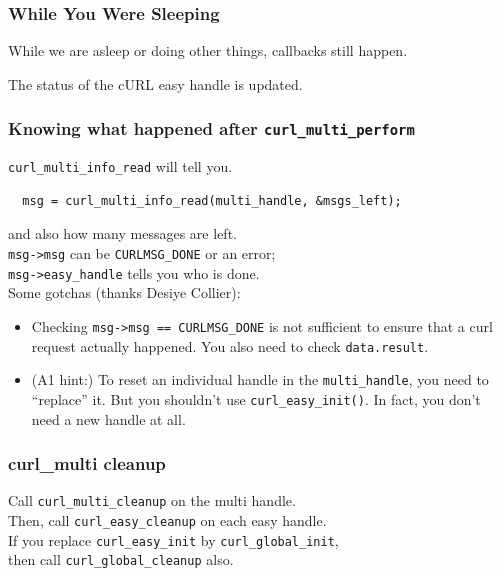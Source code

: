 \begin{frame}
\frametitle{While You Were Sleeping}

While we are asleep or doing other things, callbacks still happen.

The status of the cURL easy handle is updated.

\end{frame}




\begin{frame}[fragile]
  \frametitle{Knowing what happened after {\tt curl\_multi\_perform}}

  
    {\tt curl\_multi\_info\_read} will tell you.
  
\begin{lstlisting}
  msg = curl_multi_info_read(multi_handle, &msgs_left);
\end{lstlisting}
  
    and also how many messages are left.\\[1em]
    {\tt msg->msg} can be {\tt CURLMSG\_DONE} or an error;\\
    {\tt msg->easy\_handle} tells you who is done.\\[1em]
  

    Some gotchas (thanks Desiye Collier):
    \begin{itemize}
    \item Checking \verb+msg->msg == CURLMSG_DONE+ is not sufficient to ensure that a curl request actually happened. You also need to check {\tt data.result}.

    \item (A1 hint:) To reset an individual handle in the {\tt multi\_handle}, you need to ``replace'' it. But you shouldn't use {\tt curl\_easy\_init()}.  In fact, you don't need a new handle at all.
    \end{itemize}
  

\end{frame}



\begin{frame}
  \frametitle{curl\_multi cleanup}

  
    Call {\tt curl\_multi\_cleanup} on the multi handle.\\[1em]
    Then, call {\tt curl\_easy\_cleanup} on each easy handle.\\[2em]
    If you replace {\tt curl\_easy\_init} by {\tt curl\_global\_init},\\
    then call {\tt curl\_global\_cleanup} also.
  

\end{frame}


